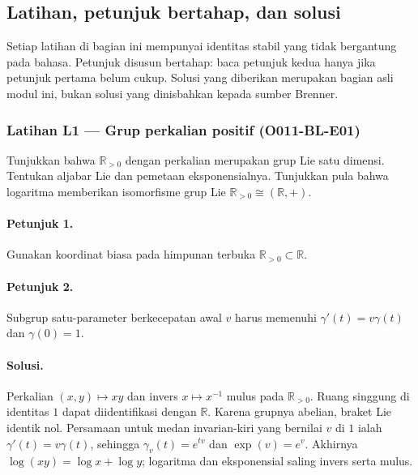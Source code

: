 
\subsection{Latihan, petunjuk bertahap, dan solusi}

Setiap latihan di bagian ini mempunyai identitas stabil yang tidak bergantung
pada bahasa. Petunjuk disusun bertahap: baca petunjuk kedua hanya jika petunjuk
pertama belum cukup. Solusi yang diberikan merupakan bagian asli modul ini,
bukan solusi yang dinisbahkan kepada sumber Brenner.

\subsubsection*{Latihan L1 — Grup perkalian positif (O011-BL-E01)}
\label{o011-bl-e01}

Tunjukkan bahwa $\mathbb R_{>0}$ dengan perkalian merupakan grup Lie
satu dimensi. Tentukan aljabar Lie dan pemetaan eksponensialnya. Tunjukkan pula
bahwa logaritma memberikan isomorfisme grup Lie
$\mathbb R_{>0}\cong(\mathbb R,+)$.

\paragraph{Petunjuk 1.}
Gunakan koordinat biasa pada himpunan terbuka $\mathbb R_{>0}\subset\mathbb R$.

\paragraph{Petunjuk 2.}
Subgrup satu-parameter berkecepatan awal $v$ harus memenuhi
$\gamma'(t)=v\gamma(t)$ dan $\gamma(0)=1$.

\paragraph{Solusi.}
Perkalian $(x,y)\mapsto xy$ dan invers $x\mapsto x^{-1}$ mulus pada
$\mathbb R_{>0}$. Ruang singgung di identitas $1$ dapat diidentifikasi dengan
$\mathbb R$. Karena grupnya abelian, braket Lie identik nol. Persamaan untuk
medan invarian-kiri yang bernilai $v$ di $1$ ialah
$\gamma'(t)=v\gamma(t)$, sehingga $\gamma_v(t)=e^{tv}$ dan
$\exp(v)=e^v$. Akhirnya $\log(xy)=\log x+\log y$; logaritma dan eksponensial
saling invers serta mulus.

